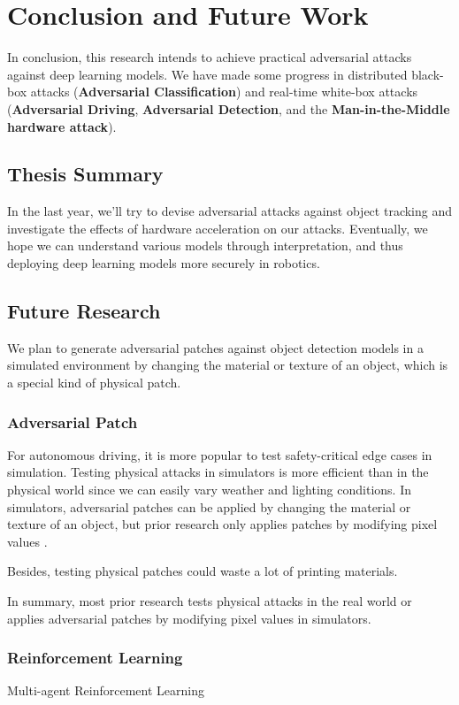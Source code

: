 \chapter{Conclusion and Future Work}

In conclusion, this research intends to achieve practical adversarial attacks against deep learning models. We have made some progress in distributed black-box attacks (\textbf{Adversarial Classification}) and real-time white-box attacks (\textbf{Adversarial Driving}, \textbf{Adversarial Detection}, and the \textbf{Man-in-the-Middle hardware attack}).

\section{Thesis Summary}

In the last year, we'll try to devise adversarial attacks against object tracking and investigate the effects of hardware acceleration on our attacks. Eventually, we hope we can understand various models through interpretation, and thus deploying deep learning models more securely in robotics.

\clearpage

\section{Future Research}

We plan to generate adversarial patches against object detection models in a simulated environment by changing the material or texture of an object, which is a special kind of physical patch.
   
\subsection{Adversarial Patch}

For autonomous driving, it is more popular to test safety-critical edge cases in simulation. Testing physical attacks in simulators is more efficient than in the physical world since we can easily vary weather and lighting conditions. In simulators, adversarial patches can be applied by changing the material or texture of an object, but prior research only applies patches by modifying pixel values \cite{mathov2021enhancing} \cite{nesti2022evaluating} \cite{rossolini2022realworld}.

Besides, testing physical patches could waste a lot of printing materials.

In summary, most prior research tests physical attacks in the real world or applies adversarial patches by modifying pixel values in simulators.

\subsection{Reinforcement Learning}

Multi-agent Reinforcement Learning
